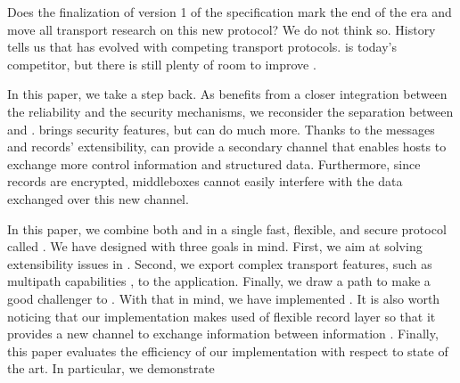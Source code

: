 Does the finalization of version 1 of the \quic specification mark the
end of the \tcp era and move all transport research on this new protocol?
We do not think so. History tells us that \tcp has evolved with competing
transport protocols. \quic is today's competitor, but there is still plenty of
room to improve \tcp.

In this paper, we take a step back. As \quic benefits from a closer integration between the reliability and the security mechanisms, we reconsider the separation between \tcp and \tls.
\tls brings security features, but  can do much more. Thanks to the  messages and records' extensibility, \tls can provide a secondary channel that enables hosts to exchange more control information and structured data. Furthermore, since \tls records are encrypted, middleboxes cannot easily interfere with the data exchanged over this new channel.


In this paper, we combine both \tcp and \tls in a single fast, flexible, and secure protocol called \textbf{\tcpls}.  We have designed \tcpls with three goals in mind.  First, we aim at solving extensibility issues in \tcp {}. Second, we export complex transport features, such as multipath capabilities , to the application.  Finally, we draw a path to make \tcpls a good challenger to \quic. With that in mind, we have implemented \tcpls {}.  It is also worth noticing that our implementation makes used of \tls flexible record layer so that it provides a new channel to exchange information between \tcpls information .  Finally, this paper evaluates the efficiency of our \tcpls implementation with respect to state of the art.  In particular, we demonstrate 


